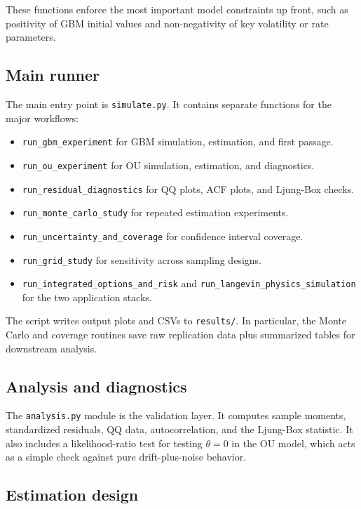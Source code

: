 \documentclass[11pt]{article}
\begin{document}
These functions enforce the most important model constraints up front, such as positivity of GBM initial values and non-negativity of key volatility or rate parameters.

\subsection{Main runner}

The main entry point is \texttt{simulate.py}. It contains separate functions for the major workflows:
\begin{itemize}[leftmargin=1.2em]
  \item \texttt{run\_gbm\_experiment} for GBM simulation, estimation, and first passage.
  \item \texttt{run\_ou\_experiment} for OU simulation, estimation, and diagnostics.
  \item \texttt{run\_residual\_diagnostics} for QQ plots, ACF plots, and Ljung-Box checks.
  \item \texttt{run\_monte\_carlo\_study} for repeated estimation experiments.
  \item \texttt{run\_uncertainty\_and\_coverage} for confidence interval coverage.
  \item \texttt{run\_grid\_study} for sensitivity across sampling designs.
  \item \texttt{run\_integrated\_options\_and\_risk} and \texttt{run\_langevin\_physics\_simulation} for the two application stacks.
\end{itemize}

The script writes output plots and CSVs to \texttt{results/}. In particular, the Monte Carlo and coverage routines save raw replication data plus summarized tables for downstream analysis.

\subsection{Analysis and diagnostics}

The \texttt{analysis.py} module is the validation layer. It computes sample moments, standardized residuals, QQ data, autocorrelation, and the Ljung-Box statistic. It also includes a likelihood-ratio test for testing $\theta = 0$ in the OU model, which acts as a simple check against pure drift-plus-noise behavior.

\subsection{Estimation design}
\end{document}
